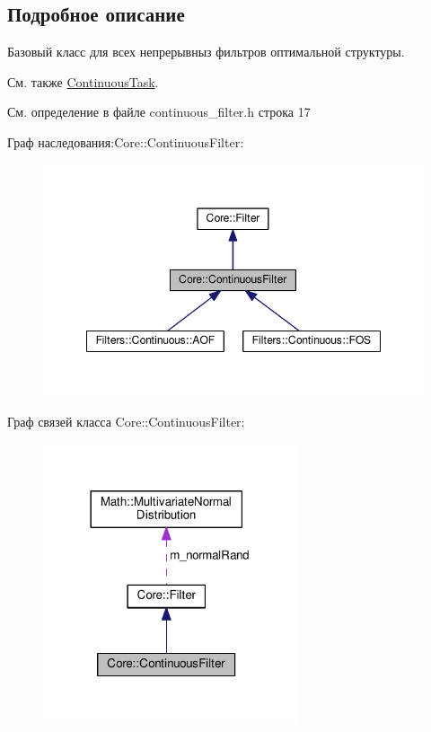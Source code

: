\subsection{Подробное описание}
Базовый класс для всех непрерывныз фильтров оптимальной структуры. 

\begin{DoxySeeAlso}{См. также}
\hyperlink{class_core_1_1_continuous_task}{Continuous\+Task}. 
\end{DoxySeeAlso}


См. определение в файле continuous\+\_\+filter.\+h строка 17



Граф наследования\+:Core\+:\+:Continuous\+Filter\+:
\nopagebreak
\begin{figure}[H]
\begin{center}
\leavevmode
\includegraphics[width=348pt]{class_core_1_1_continuous_filter__inherit__graph}
\end{center}
\end{figure}


Граф связей класса Core\+:\+:Continuous\+Filter\+:
\nopagebreak
\begin{figure}[H]
\begin{center}
\leavevmode
\includegraphics[width=213pt]{class_core_1_1_continuous_filter__coll__graph}
\end{center}
\end{figure}


